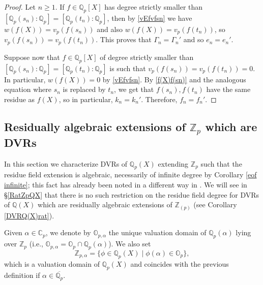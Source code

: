 \documentclass[10pt]{article}
\numberwithin{equation}{section}
\theoremstyle{definition}\newtheorem{Def}[equation]{Definition}
\theoremstyle{definition}\newtheorem{Ques}[equation]{Question}
\newcommand{\Q}{\mathbb{Q}}
\newcommand{\Z}{\mathbb{Z}}
\renewcommand{\O}{\mathbb{O}}
\newcommand{\C}{\mathbb{C}}
\newcommand{\oQp}{\overline{\Q_p}}
\begin{document}
\begin{proof}
Let $n\geq 1$. If $f\in \Q_p[X]$ has  degree strictly smaller than $[\Q_p(s_n):\Q_p]=[\Q_p(t_n):\Q_p]$, then by \eqref{vEfvfsn} we have $w(f(X))=v_p(f(s_n))$ and also $w(f(X))=v_p(f(t_n))$, so $v_p(f(s_n))=v_p(f(t_n))$. This proves that $\Gamma_n=\Gamma_n'$ and so $e_n=e_n'$.

Suppose now that $f\in \Q_p[X]$ of degree strictly smaller than $[\Q_p(s_n):\Q_p]=[\Q_p(t_n):\Q_p]$ is such that $v_p(f(s_n))=v_p(f(t_n))=0$. In particular,  $w(f(X))=0$ by \eqref{vEfvfsn}. By \eqref{f(X)f(sn)}  and the analogous equation where $s_n$ is   replaced by $t_n$, we get that $f(s_n),f(t_n)$ have the same residue as $f(X)$, so in particular, $k_n=k_n'$. Therefore, $f_n=f_n'$.
\end{proof}

\subsection{Residually algebraic extensions of $\Z_p$ which are DVRs}

In this section we characterize DVRs of $\Q_p(X)$ extending $\Z_p$ such that the residue field extension is algebraic, necessarily of infinite degree by Corollary \ref{eof infinite}; this fact has already been noted in a different way in \cite[p. 4217]{PerTransc}. We will see in \S \ref{RatZpQX} that there is no such restriction on the residue field degree for DVRs of $\Q(X)$ which are residually algebraic extensions of $\Z_{(p)}$ (see Corollary \ref{DVRQ(X)rat}).

Given $\alpha\in\C_p$, we denote by $\O_{p,\alpha}$ the unique valuation domain of $\Q_p(\alpha)$ lying over $\Z_p$ (i.e., $\O_{p,\alpha}=\O_p\cap\Q_p(\alpha)$). We also set
$$\Z_{p,\alpha}=\{\phi\in\Q_p(X)\mid \phi(\alpha)\in \O_p\},$$
which is a valuation domain of $\Q_p(X)$ and coincides with the previous definition if $\alpha\in\oQp$. 
\end{document}

